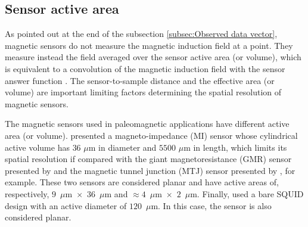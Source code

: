 \documentclass[draft,gc]{agutex}
\begin{document}
\begin{article}
\subsection{Sensor active area}
\label{subsec:Sensor active area}

As pointed out at the end of the subsection 
\ref{subsec:Observed data vector}, 
magnetic sensors do not measure the magnetic induction 
field at a point. They measure instead the field averaged 
over the sensor active area (or volume), which is equivalent to a 
convolution of the magnetic induction field with 
the sensor answer function \citep{roth1989, egli2000, lima2013}.
The sensor-to-sample distance and the effective area (or volume) 
are important limiting factors determining the spatial resolution 
of magnetic sensors.

The magnetic sensors used in paleomagnetic applications have
different active area (or volume). 
\citet{uehara2007, uehara2008} presented a magneto-impedance (MI) 
sensor whose cylindrical active volume has $36$ $\mu$m in diameter and 
$5500$ $\mu$m in length, which limits its spatial resolution
if compared with the giant magnetoresistance 
(GMR) sensor presented by \citet{hankard2009} and the magnetic 
tunnel junction (MTJ) sensor presented by \citet{lima2014}, for example.
These two sensors are considered planar and have active areas
of, respectively, $9$~$\mu$m~$\times$~$36$~$\mu$m and 
$\approx 4$~$\mu$m~$\times$~$2$~$\mu$m.
Finally, \citet{fong2005} used a bare SQUID design with an 
active diameter of $120$~$\mu$m. In this case, the sensor 
is also considered planar.


\end{article}
\end{document}
